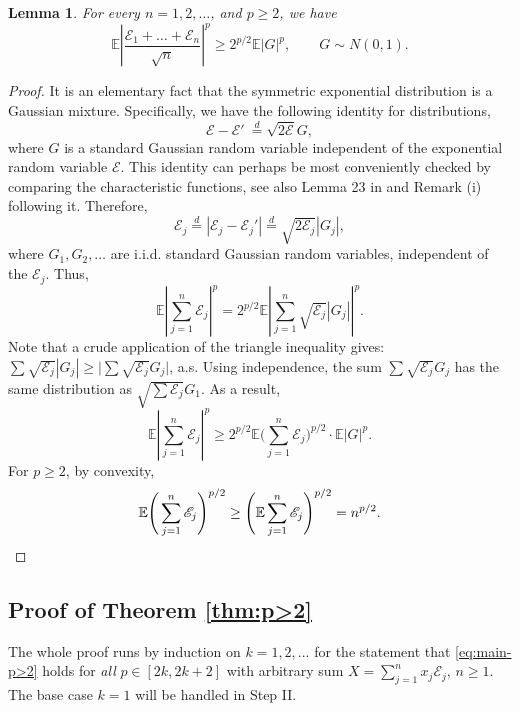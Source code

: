 \documentclass[10pt]{article}
\newcommand{\E}{\mathbb{E}}
\newcommand{\1}{\textbf{1}}
\newcommand{\cE}{\mathscr{E}}
\newtheorem{lemma}[theorem]{Lemma}
\theoremstyle{remark}
\theoremstyle{definition}
\begin{document}
\begin{lemma}\label{lm:all-equal}
For every $n = 1, 2, \dots$, and $p \geq 2$, we have
\[ 
\E\left|\frac{\cE_1 + \dots + \cE_n}{\sqrt{n}}\right|^p \geq 2^{p/2}\E|G|^p, \qquad G \sim N(0,1).
 \]
\end{lemma}
\begin{proof}
It is an elementary fact that the symmetric exponential distribution is a Gaussian mixture. Specifically, we have the following identity for distributions,
\[ 
\cE - \cE' \ \overset{d}{=} \sqrt{2\cE}G,
 \]
where $G$ is a standard Gaussian random variable independent of the exponential random variable $\cE$. This identity can perhaps be most conveniently checked by comparing the characteristic functions, see also Lemma 23 in \cite{ENT1} and Remark (i) following it. Therefore,
\[ 
\cE_j \overset{d}{=} |\cE_j - \cE_j'| \overset{d}{=}  \sqrt{2\cE_j}|G_j|,
 \]
where $G_1, G_2, \dots$ are i.i.d. standard Gaussian random variables, independent of the $\cE_j$. Thus,
\[ 
\E\left|\sum_{j=1}^n \cE_j\right|^p = 2^{p/2}\E\left|\sum_{j=1}^n \sqrt{\cE_j}|G_j|\right|^p.
 \]
Note that a crude application of the triangle inequality gives: $\sum \sqrt{\cE_j}|G_j| \geq \Big|\sum \sqrt{\cE_j}G_j\Big|$, a.s. Using independence, the sum $\sum \sqrt{\cE_j}G_j$ has the same distribution as $\sqrt{\sum \cE_j}G_1$. As a result,
\[ 
\E\left|\sum_{j=1}^n \cE_j\right|^p \geq 2^{p/2}\E\Bigg(\sum_{j=1}^n \cE_j\Bigg)^{p/2}\cdot \E|G|^p.
 \]
For $p \geq 2$, by convexity, 
\[
\E\Bigg(\sum_{j=1}^n \cE_j\Bigg)^{p/2} \geq \Bigg(\E\sum_{j=1}^n \cE_j\Bigg)^{p/2} = n^{p/2}.\qedhere
\]
\end{proof}



\subsection{Proof of Theorem \ref{thm:p>2}}


The whole proof runs by  induction on $k = 1, 2, \dots$ for the statement that \eqref{eq:main-p>2} holds for \emph{all} $p \in [2k, 2k+2]$ with arbitrary sum $X = \sum_{j=1}^n x_j\cE_j$, $n \geq 1$. The base case $k = 1$ will be handled in Step II. 
\end{document}
